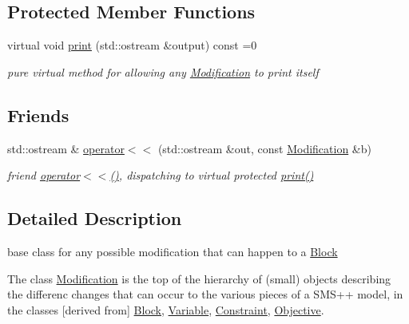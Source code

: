 \subsection*{Protected Member Functions}
\begin{DoxyCompactItemize}
\item 
virtual void \mbox{\hyperlink{class_s_m_spp__di__unipi__it_1_1_modification_a74372464f55d9c2cfdb603bf030f902f}{print}} (std\+::ostream \&output) const =0
\begin{DoxyCompactList}\small\item\em {\itshape pure virtual} method for allowing any \mbox{\hyperlink{class_s_m_spp__di__unipi__it_1_1_modification}{Modification}} to print itself \end{DoxyCompactList}\end{DoxyCompactItemize}
\subsection*{Friends}
\begin{DoxyCompactItemize}
\item 
std\+::ostream \& \mbox{\hyperlink{class_s_m_spp__di__unipi__it_1_1_modification_a293082986307592d7e934c2bb061ffac}{operator$<$$<$}} (std\+::ostream \&out, const \mbox{\hyperlink{class_s_m_spp__di__unipi__it_1_1_modification}{Modification}} \&b)
\begin{DoxyCompactList}\small\item\em friend \mbox{\hyperlink{class_s_m_spp__di__unipi__it_1_1_modification_a293082986307592d7e934c2bb061ffac}{operator$<$$<$()}}, dispatching to virtual protected \mbox{\hyperlink{class_s_m_spp__di__unipi__it_1_1_modification_a74372464f55d9c2cfdb603bf030f902f}{print()}} \end{DoxyCompactList}\end{DoxyCompactItemize}


\subsection{Detailed Description}
base class for any possible modification that can happen to a \mbox{\hyperlink{class_s_m_spp__di__unipi__it_1_1_block}{Block}} 

The class \mbox{\hyperlink{class_s_m_spp__di__unipi__it_1_1_modification}{Modification}} is the top of the hierarchy of (small) objects describing the differenc changes that can occur to the various pieces of a S\+M\+S++ model, in the classes \mbox{[}derived from\mbox{]} \mbox{\hyperlink{class_s_m_spp__di__unipi__it_1_1_block}{Block}}, \mbox{\hyperlink{class_s_m_spp__di__unipi__it_1_1_variable}{Variable}}, \mbox{\hyperlink{class_s_m_spp__di__unipi__it_1_1_constraint}{Constraint}}, \mbox{\hyperlink{class_s_m_spp__di__unipi__it_1_1_objective}{Objective}}.


